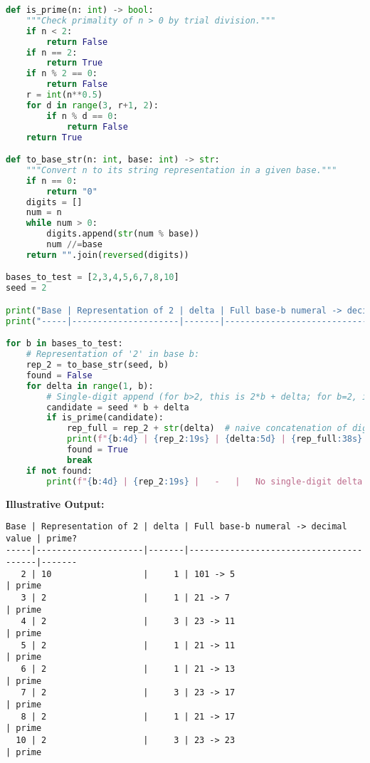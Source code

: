 \documentclass[11pt]{article}
\begin{document}
\begin{lstlisting}[language=Python,caption={Python code testing small bases for valid $\delta_b$ that yield primes.}]
def is_prime(n: int) -> bool:
    """Check primality of n > 0 by trial division."""
    if n < 2:
        return False
    if n == 2:
        return True
    if n % 2 == 0:
        return False
    r = int(n**0.5)
    for d in range(3, r+1, 2):
        if n % d == 0:
            return False
    return True

def to_base_str(n: int, base: int) -> str:
    """Convert n to its string representation in a given base."""
    if n == 0:
        return "0"
    digits = []
    num = n
    while num > 0:
        digits.append(str(num % base))
        num //=base
    return "".join(reversed(digits))

bases_to_test = [2,3,4,5,6,7,8,10]
seed = 2

print("Base | Representation of 2 | delta | Full base-b numeral -> decimal value | prime?")
print("-----|---------------------|-------|----------------------------------------|-------")

for b in bases_to_test:
    # Representation of '2' in base b:
    rep_2 = to_base_str(seed, b)
    found = False
    for delta in range(1, b):
        # Single-digit append (for b>2, this is 2*b + delta; for b=2, it's 4 + delta)
        candidate = seed * b + delta
        if is_prime(candidate):
            rep_full = rep_2 + str(delta)  # naive concatenation of digits
            print(f"{b:4d} | {rep_2:19s} | {delta:5d} | {rep_full:38s} -> {candidate:4d} | prime")
            found = True
            break
    if not found:
        print(f"{b:4d} | {rep_2:19s} |   -   |   No single-digit delta found   | none")
\end{lstlisting}

\vspace{1em}
\noindent
\textbf{Illustrative Output:}
\begin{verbatim}
Base | Representation of 2 | delta | Full base-b numeral -> decimal value | prime?
-----|---------------------|-------|----------------------------------------|-------
   2 | 10                  |     1 | 101 -> 5                               | prime
   3 | 2                   |     1 | 21 -> 7                                | prime
   4 | 2                   |     3 | 23 -> 11                               | prime
   5 | 2                   |     1 | 21 -> 11                               | prime
   6 | 2                   |     1 | 21 -> 13                               | prime
   7 | 2                   |     3 | 23 -> 17                               | prime
   8 | 2                   |     1 | 21 -> 17                               | prime
  10 | 2                   |     3 | 23 -> 23                               | prime
\end{verbatim}
\end{document}
